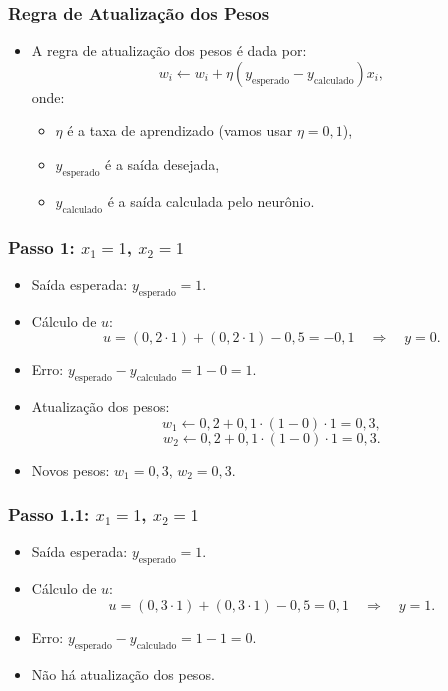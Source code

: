 \documentclass[aspectratio=169]{beamer}
\begin{document}
\begin{frame}
\frametitle{Regra de Atualização dos Pesos}
\begin{itemize}
    \item A regra de atualização dos pesos é dada por:
    \[
    w_i \leftarrow w_i + \eta (y_{\text{esperado}} - y_{\text{calculado}}) x_i,
    \]
    onde:
    \begin{itemize}
        \item \( \eta \) é a taxa de aprendizado (vamos usar \( \eta = 0,1 \)),
        \item \( y_{\text{esperado}} \) é a saída desejada,
        \item \( y_{\text{calculado}} \) é a saída calculada pelo neurônio.
    \end{itemize}
\end{itemize}
\end{frame}

\begin{frame}
\frametitle{Passo 1: \( x_1 = 1 \), \( x_2 = 1 \)}
\begin{itemize}
    \item Saída esperada: \( y_{\text{esperado}} = 1 \).
    \item Cálculo de \( u \):
    \[
    u = (0,2 \cdot 1) + (0,2 \cdot 1) - 0,5 = -0,1 \quad \Rightarrow \quad y = 0.
    \]
    \item Erro: \( y_{\text{esperado}} - y_{\text{calculado}} = 1 - 0 = 1 \).
    \item Atualização dos pesos:
    \[
    w_1 \leftarrow 0,2 + 0,1 \cdot (1-0) \cdot 1 = 0,3,
    \]
    \[
    w_2 \leftarrow 0,2 + 0,1 \cdot (1-0) \cdot 1 = 0,3.
    \]
    \item Novos pesos: \( w_1 = 0,3 \), \( w_2 = 0,3 \).
\end{itemize}
\end{frame}

\begin{frame}
\frametitle{Passo 1.1: \( x_1 = 1 \), \( x_2 = 1 \)}
\begin{itemize}
    \item Saída esperada: \( y_{\text{esperado}} = 1 \).
    \item Cálculo de \( u \):
    \[
    u = (0,3 \cdot 1) + (0,3 \cdot 1) - 0,5 = 0,1 \quad \Rightarrow \quad y = 1.
    \]
    \item Erro: \( y_{\text{esperado}} - y_{\text{calculado}} = 1 - 1 = 0 \).
   \item Não há atualização dos pesos.
\end{itemize}
\end{frame}
\end{document}
